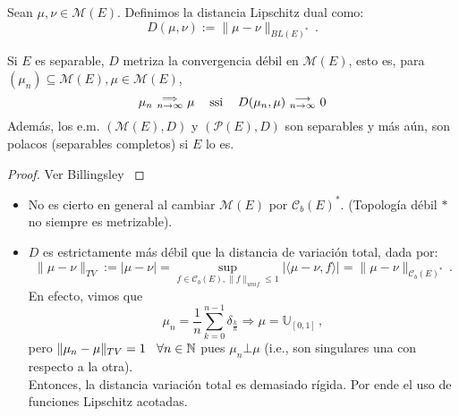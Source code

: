 \begin{definition}
Sean $\mu,\nu\in\mathcal{M}(E)$. Definimos la distancia Lipschitz dual como: $$D(\mu,\nu):=\|\mu-\nu\|_{BL(E)^*} \, .$$
\end{definition}

\begin{theorem}
Si $E$ es separable, $D$ metriza la convergencia débil en $\mathcal{M}(E)$, esto es, para  $(\mu_n)\subseteq\mathcal{M}(E),\mu\in\mathcal{M}(E)$,
$$ \mu_n \mbox{ }\substack{\Longrightarrow \\n \to \infty}\mbox{ } \mu \hspace{.25cm}\, \mbox{ ssi } \hspace{.25cm}\, D(\mu_n,\mu)\mbox{ }\substack{\longrightarrow \\ n\to\infty}\mbox{ }0$$
Además, los e.m. $(\mathcal{M}(E),D)$ y $(\mathcal{P}(E),D)$ son separables y más aún, son polacos (separables completos) si $E$ lo es.
\end{theorem}
\begin{proof}
\gris Ver Billingsley \cite{billing} \negro
\end{proof}
\begin{remark}
\beforeitemize
\begin{itemize}
\item No es cierto en general al cambiar $\mathcal{M}(E)$ por $\mathcal{C}_b(E)^*$. (Topología débil $*$ no siempre es metrizable).
\item $D$ es estrictamente más débil que la distancia de variación total, dada por: 
$$\|\mu-\nu\|_{TV}:=|\mu-\nu|= \displaystyle\sup_{f\in \mathcal{C}_b(E),\|f\|_{unif}\leq 1}|\langle \mu-\nu,f\rangle|=\|\mu-\nu\|_{\mathcal{C}_b(E)^*} \, . $$
En efecto,  vimos que
$$ \mu_n=\frac{1}{n}\displaystyle\sum^{n-1}_{k=0}\delta_{\frac{k}{n}}\Longrightarrow\mu=\mathbb{U}_{[0,1]} \, , $$
pero $\|\mu_n-\mu\|_{TV}=1\hspace{.25cm}\,\forall n\in\mathbb{N}$ pues $\mu_n\bot\mu$ (i.e., son singulares una con respecto a la otra). 
\\ Entonces, la distancia variación total es demasiado rígida. Por ende el uso de funciones Lipschitz acotadas.
\end{itemize}
\end{remark}


